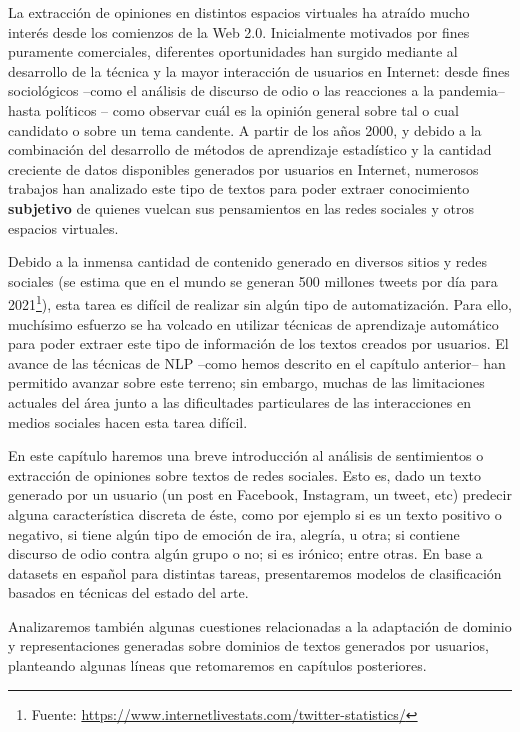 \label{chap:03_social_text_classification}

La extracción de opiniones en distintos espacios virtuales ha atraído mucho interés desde los comienzos de la Web 2.0. Inicialmente motivados por fines puramente comerciales, diferentes oportunidades han surgido mediante al desarrollo de la técnica y la mayor interacción de usuarios en Internet: desde fines sociológicos --como el análisis de discurso de odio o las reacciones a la pandemia-- hasta políticos -- como observar cuál es la opinión general sobre tal o cual candidato o sobre un tema candente. A partir de los años 2000, y debido a la combinación del desarrollo de métodos de aprendizaje estadístico y la cantidad creciente de datos disponibles generados por usuarios en Internet, numerosos trabajos han analizado este tipo de textos para poder extraer conocimiento \textbf{subjetivo} de quienes vuelcan sus pensamientos en las redes sociales y otros espacios virtuales.

Debido a la inmensa cantidad de contenido generado en diversos sitios y redes sociales (se estima que en el mundo se generan 500 millones tweets por día para 2021\footnote{Fuente: \url{https://www.internetlivestats.com/twitter-statistics/}}), esta tarea es difícil de realizar sin algún tipo de automatización. Para ello, muchísimo esfuerzo se ha volcado en utilizar técnicas de aprendizaje automático para poder extraer este tipo de información de los textos creados por usuarios. El avance de las técnicas de NLP --como hemos descrito en el capítulo anterior-- han permitido avanzar sobre este terreno; sin embargo, muchas de las limitaciones actuales del área junto a las dificultades particulares de las interacciones en medios sociales hacen esta tarea difícil.

En este capítulo haremos una breve introducción al análisis de sentimientos o extracción de opiniones sobre textos de redes sociales. Esto es, dado un texto generado por un usuario (un post en Facebook, Instagram, un tweet, etc) predecir alguna característica discreta de éste, como por ejemplo si es un texto positivo o negativo, si tiene algún tipo de emoción de ira, alegría, u otra; si contiene discurso de odio contra algún grupo o no; si es irónico; entre otras. En base a datasets en español para distintas tareas, presentaremos modelos de clasificación basados en técnicas del estado del arte.

Analizaremos también algunas cuestiones relacionadas a la adaptación de dominio y representaciones generadas sobre dominios de textos generados por usuarios, planteando algunas líneas que retomaremos en capítulos posteriores.


